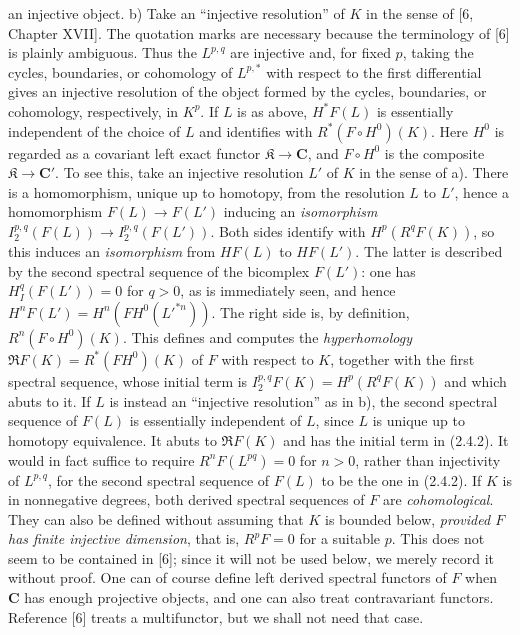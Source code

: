 
\noindent an injective object.
b) Take an ``injective resolution'' of $K$ in the sense of [6, Chapter XVII].
The quotation marks are necessary because the terminology of [6] is plainly
ambiguous. Thus the $L^{p,q}$ are injective and, for fixed $p$, taking the
cycles, boundaries, or cohomology of $L^{p,*}$ with respect to the first
differential gives an injective resolution of the object formed by the cycles,
boundaries, or cohomology, respectively, in $K^p$.
If $L$ is as above, $H^*F(L)$ is essentially independent of the choice of $L$
and identifies with $R^*(F\mathbin{\circ}H^0)(K)$. Here $H^0$ is regarded as a
covariant left exact functor $\mathfrak K\to \mathbf{C}$, and
$F\mathbin{\circ}H^0$ is the composite $\mathfrak K\to \mathbf{C}'$. To see
this, take an injective resolution $L'$ of $K$ in the sense of a). There is a
homomorphism, unique up to homotopy, from the resolution $L$ to $L'$, hence a
homomorphism $F(L)\to F(L')$ inducing an \textit{isomorphism}
$I_2^{p,q}(F(L))\to
I_2^{p,q}(F(L'))$.
Both sides identify with $H^p(R^qF(K))$, so this induces an \textit{isomorphism} from
$HF(L)$ to $HF(L')$. The latter is described by the second spectral sequence
of the bicomplex $F(L')$: one has $H_{I}^q(F(L'))=0$ for $q>0$, as is immediately seen, and
hence
$H^nF(L')=H^n(FH^0(L'^{*n}))$.
The right side is, by definition, $R^n(F\mathbin{\circ}H^0)(K)$. This defines
and computes the \textit{hyperhomology}
$\mathfrak R F(K)=R^*(FH^0)(K)$ of $F$ with respect to $K$, together
with the first spectral sequence, whose initial term is
$I_2^{p,q}F(K)=H^p(R^qF(K))$ and which abuts to it.
If $L$ is instead an ``injective resolution'' as in b), the second spectral
sequence of $F(L)$ is essentially independent of $L$, since $L$ is unique up
to homotopy equivalence. It abuts to $\mathfrak R F(K)$ and has the initial
term in (2.4.2). It would in fact suffice to require
$R^nF(L^{pq})=0$ for $n>0$, rather than injectivity of $L^{p,q}$, for the
second spectral sequence of $F(L)$ to be the one in (2.4.2).
If $K$ is in nonnegative degrees, both derived spectral sequences of $F$ are
\textit{cohomological}. They can also be defined without assuming that $K$ is bounded
below, \textit{provided $F$ has finite injective dimension}, that is, $R^pF=0$ for a
suitable $p$. This does not seem to be contained in [6]; since it will not be
used below, we merely record it without proof. One can of course define left
derived spectral functors of $F$ when $\mathbf{C}$ has enough projective objects, and
one can also treat contravariant functors. Reference [6] treats a
multifunctor, but we shall not need that case.

